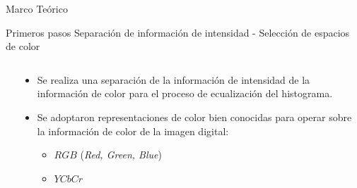 \documentclass[usenames,dvipsnames]{beamer}
\begin{document}
\begin{frame}{Marco Teórico}
\begin{alertblock}{Primeros pasos}
Separación de información de intensidad - Selección de espacios de color
\end{alertblock}
\vspace{-0.5cm}
\begin{columns}[t]
\begin{column}{.3\textwidth}
\end{column}
\begin{column}{.7\textwidth}
\begin{itemize}
	\item Se realiza una separación de la información de intensidad de la información de color para el proceso de ecualización del histograma.
	\item Se adoptaron representaciones de color bien conocidas para operar sobre la información de color de la imagen digital:
	\begin{itemize}
		\item $RGB$ (\textit{Red, Green, Blue})
		\item $YCbCr$
	\end{itemize}
\end{itemize}
\end{column}
\end{columns}
\end{frame}





\end{document}
